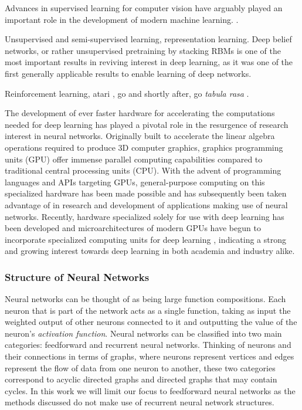 Advances in supervised learning for computer vision have arguably played an important role in the development of modern machine learning. \cite{imagenet}.

Unsupervised and semi-supervised learning, representation learning. Deep belief networks, or rather unsupervised pretraining by stacking RBMs is one of the most important results in reviving interest in deep learning, as it was one of the first generally applicable results to enable learning of deep networks. 

Reinforcement learning, atari \cite{deep_atari}, go \cite{alphago} and shortly after, go \textit{tabula rasa} \cite{alphazero}.

The development of ever faster hardware for accelerating the computations needed for deep learning has played a pivotal role in the resurgence of research interest in neural networks. Originally built to accelerate the linear algebra operations required to produce 3D computer graphics, graphics programming units (GPU) offer immense parallel computing capabilities compared to traditional central processing units (CPU). With the advent of programming languages and APIs targeting GPUs, general-purpose computing on this specialized hardware has been made possible and has subsequently been taken advantage of in research and development of applications making use of neural networks. Recently, hardware specialized solely for use with deep learning has been developed \cite{tpu} and microarchitectures of modern GPUs have begun to incorporate specialized computing units for deep learning \cite{nvidia_tensor_core}, indicating a strong and growing interest towards deep learning in both academia and industry alike.

\subsubsection{Structure of Neural Networks}

Neural networks can be thought of as being large function compositions. Each neuron that is part of the network acts as a single function, taking as input the weighted output of other neurons connected to it and outputting the value of the neuron's \textit{activation function}. Neural networks can be classified into two main categories: feedforward and recurrent neural networks. Thinking of neurons and their connections in terms of graphs, where neurons represent vertices and edges represent the flow of data from one neuron to another, these two categories correspond to acyclic directed graphs and directed graphs that may contain cycles. In this work we will limit our focus to feedforward neural networks as the methods discussed do not make use of recurrent neural network structures.

